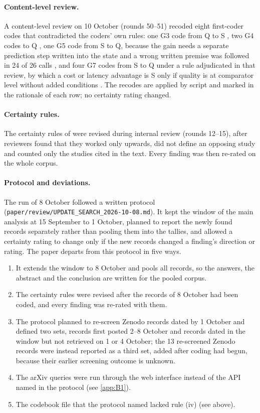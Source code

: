 \paragraph{Content-level review.} A content-level review on 10 October (rounds 50--51) recoded eight first-coder codes that contradicted the coders' own rules: one G3 code from Q to S \cite{qin2026zhdecisionbench}, two G4 codes to Q \cite{zen23032384,zen23047544}, one G5 code from S to Q, because the gain needs a separate prediction step written into the state and a wrong written premise was followed in 24 of 26 calls \cite{arx01834}, and four G7 codes from S to Q under a rule adjudicated in that review, by which a cost or latency advantage is S only if quality is at comparator level without added conditions \cite{arx00346,arx01079,arx02046,arx02048}. The recodes are applied by script and marked in the rationale of each row; no certainty rating changed.

\paragraph{Certainty rules.} The certainty rules of  were revised during internal review (rounds 12--15), after reviewers found that they worked only upwards, did not define an opposing study and counted only the studies cited in the text. Every finding was then re-rated on the whole corpus.

\paragraph{Protocol and deviations.} The run of 8 October followed a written protocol (\nolinkurl{paper/review/UPDATE_SEARCH_2026-10-08.md}). It kept the window of the main analysis at 15 September to 1 October, planned to report the newly found records separately rather than pooling them into the tallies, and allowed a certainty rating to change only if the new records changed a finding's direction or rating. The paper departs from this protocol in five ways.
\begin{enumerate}
\item It extends the window to 8 October and pools all records, so the answers, the abstract and the conclusion are written for the pooled corpus.
\item The certainty rules were revised after the records of 8 October had been coded, and every finding was re-rated with them.
\item The protocol planned to re-screen Zenodo records dated by 1 October and defined two sets, records first posted 2--8 October and records dated in the window but not retrieved on 1 or 4 October; the 13 re-screened Zenodo records were instead reported as a third set, added after coding had begun, because their earlier screening outcome is unknown.
\item The arXiv queries were run through the web interface instead of the API named in the protocol (see \cref{app:B1}).
\item The codebook file that the protocol named lacked rule (iv) (see above).
\end{enumerate}

